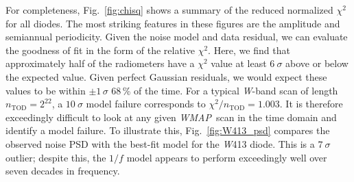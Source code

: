 \documentclass[twocolumn]{../../common/aa}
\def\WMAP{\emph{WMAP}}
\newcommand{\W}[0]{\textit W}
\begin{document}
For completeness, Fig.~\ref{fig:chisq} shows a summary of the reduced
normalized $\chi^2$ for all diodes. The most striking features in
these figures are the amplitude and semiannual periodicity.  Given
the noise model and data residual, we can evaluate the goodness of fit
in the form of the relative $\chi^2$. Here, we find that approximately
half of the radiometers have a $\chi^2$ value at least $6~\sigma$ above
or below the expected value.  Given perfect Gaussian residuals, we
would expect these values to be within $\pm1\,\sigma$ 68\,\% of the time. For
a typical \W-band scan of length $n_\mathrm{TOD}=2^{22}$, a $10~\sigma$
model failure corresponds to $\chi^2/n_\mathrm{TOD}=1.003$. It is
therefore exceedingly difficult to look at any given \WMAP\ scan in
the time domain and identify a model failure. To illustrate this,
Fig.~\ref{fig:W413_psd} compares the observed noise PSD with the
best-fit model for the \W413 diode. This is a $7~\sigma$ outlier;
despite this, the $1/f$ model appears to perform exceedingly well over
seven decades in frequency.
\end{document}
